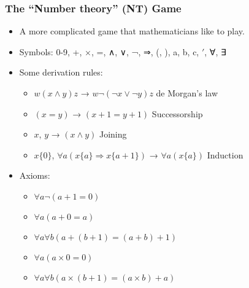 \documentclass[mathserif]{beamer}
\begin{document}
\begin{frame}
\frametitle{The ``Number theory'' (NT) Game}
\label{sec-2-4}
\begin{itemize}

\item A more complicated game that mathematicians like to play.\\
\label{sec-2-4-1}%
\item Symbols: 0-9, +, ×, =, ∧, ∨, ¬, ⇒, (, ), a, b, c, $\prime$, ∀, ∃\\
\label{sec-2-4-2}%
\item Some derivation rules:
\label{sec-2-4-3}%
\begin{itemize}

\item $w(x ∧ y)z$ → $w¬(¬x ∨ ¬y)z$ \hfill de Morgan's law\\
\label{sec-2-4-3-1}%
\item $(x = y)$ → $(x+1 = y+1)$ \hfill Successorship\\
\label{sec-2-4-3-2}%
\item $x$, $y$ → $(x ∧ y)$ \hfill Joining\\
\label{sec-2-4-3-3}%
\item $x\{0\}$, $∀a (x\{a\} ⇒ x\{a+1\})$ → $∀a (x\{a\})$ \hfill Induction\\
\label{sec-2-4-3-4}%
\end{itemize} %

\item Axioms:
\label{sec-2-4-4}%
\begin{itemize}

\item $∀a ¬(a+1 = 0)$\\
\label{sec-2-4-4-1}%
\item $∀a (a+0 = a)$\\
\label{sec-2-4-4-2}%
\item $∀a∀b (a + (b+1) = (a+b) + 1)$\\
\label{sec-2-4-4-3}%
\item $∀a (a×0 = 0)$\\
\label{sec-2-4-4-4}%
\item $∀a∀b (a × (b+1) = (a×b) + a)$\\
\label{sec-2-4-4-5}%
\end{itemize} %
\end{itemize} %
\end{frame}
\end{document}
